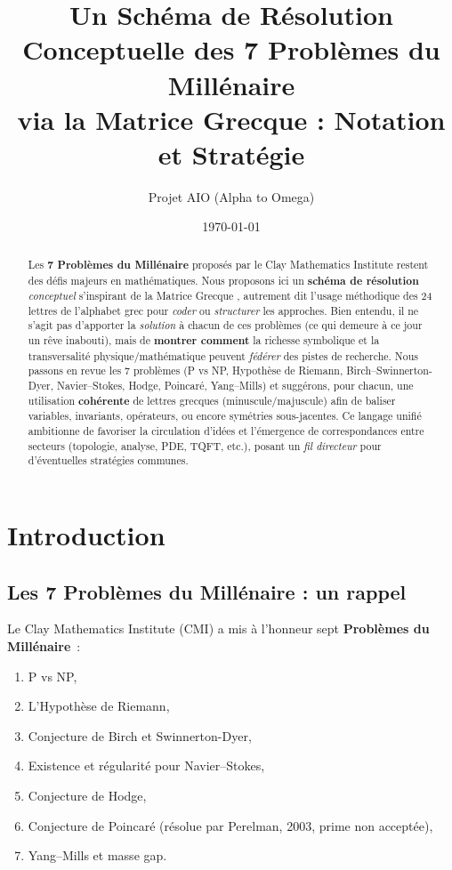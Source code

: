 \documentclass[12pt]{article}
\title{\textbf{Un Schéma de Résolution Conceptuelle des 7 Problèmes du Millénaire}\\
via la \og Matrice Grecque \fg{} : Notation et Stratégie}
\author{Projet AIO (Alpha to Omega)}
\date{\today}
\begin{document}
\maketitle

\begin{abstract}
Les \textbf{7 Problèmes du Millénaire} proposés par le Clay Mathematics Institute 
restent des défis majeurs en mathématiques. 
Nous proposons ici un \textbf{schéma de résolution} \emph{conceptuel} 
s’inspirant de la \og Matrice Grecque \fg{}, autrement dit l’usage méthodique 
des 24 lettres de l’alphabet grec pour \emph{coder} ou \emph{structurer} 
les approches. Bien entendu, il ne s’agit pas d’apporter la \emph{solution} 
à chacun de ces problèmes (ce qui demeure à ce jour un rêve inabouti), 
mais de \textbf{montrer comment} la richesse symbolique 
et la transversalité physique/mathématique peuvent \emph{fédérer} des pistes de recherche. 
Nous passons en revue les 7 problèmes (P vs NP, Hypothèse de Riemann, Birch--Swinnerton-Dyer, 
Navier--Stokes, Hodge, Poincaré, Yang--Mills) et suggérons, pour chacun, 
une utilisation \textbf{cohérente} de lettres grecques (minuscule/majuscule) 
afin de baliser variables, invariants, opérateurs, ou encore symétries sous-jacentes. 
Ce \og langage \fg{} unifié ambitionne de favoriser la circulation d’idées 
et l’émergence de correspondances entre secteurs (topologie, analyse, PDE, TQFT, etc.), 
posant un \emph{fil directeur} pour d’éventuelles stratégies communes.
\end{abstract}

\tableofcontents

\section{Introduction}
\label{sec:intro}

\subsection{Les 7 Problèmes du Millénaire : un rappel}
Le Clay Mathematics Institute (CMI) a mis à l’honneur sept \textbf{Problèmes du Millénaire}~:
\begin{enumerate}
    \item P vs NP,
    \item L’Hypothèse de Riemann,
    \item Conjecture de Birch et Swinnerton-Dyer,
    \item Existence et régularité pour Navier--Stokes,
    \item Conjecture de Hodge,
    \item Conjecture de Poincaré (résolue par Perelman, 2003, prime non acceptée),
    \item Yang--Mills et masse gap.
\end{enumerate}
\end{document}
